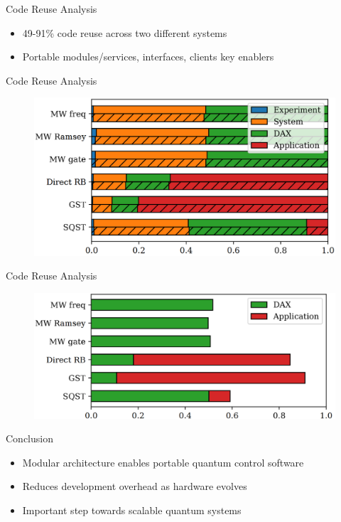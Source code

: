 \documentclass[18 pt]{beamer}
\begin{document}
\begin{frame}{Code Reuse Analysis}
\begin{itemize}
\item 49-91\% code reuse across two different systems
\item Portable modules/services, interfaces, clients key enablers
\end{itemize}
\end{frame}

\begin{frame}{Code Reuse Analysis}
  \begin{figure}
    \includegraphics[width=.8\textwidth]{fig6.png}
  \end{figure}
\end{frame}
\begin{frame}{Code Reuse Analysis}
  \begin{figure}
    \includegraphics[width=.8\textwidth]{fig7.png}
  \end{figure}
\end{frame}
\begin{frame}{Conclusion}
\begin{itemize}
\item Modular architecture enables portable quantum control software
\item Reduces development overhead as hardware evolves
\item Important step towards scalable quantum systems
\end{itemize}

\end{frame}
\end{document}
